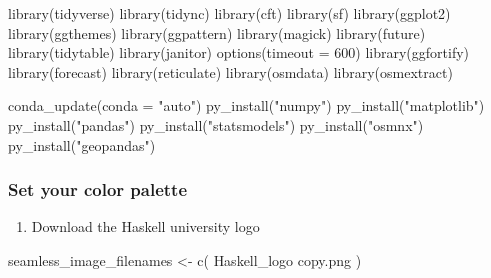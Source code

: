 \documentclass[
  paper=a4,
  ,captions=tableheading
]{scrartcl}
\newenvironment{Shaded}{\begin{snugshade}}{\end{snugshade}}
\newcommand{\AttributeTok}[1]{\textcolor[rgb]{0.77,0.63,0.00}{#1}}
\newcommand{\DecValTok}[1]{\textcolor[rgb]{0.00,0.00,0.81}{#1}}
\newcommand{\FunctionTok}[1]{\textcolor[rgb]{0.00,0.00,0.00}{#1}}
\newcommand{\NormalTok}[1]{#1}
\newcommand{\OtherTok}[1]{\textcolor[rgb]{0.56,0.35,0.01}{#1}}
\newcommand{\StringTok}[1]{\textcolor[rgb]{0.31,0.60,0.02}{#1}}
\providecommand{\tightlist}{%
  \setlength{\itemsep}{0pt}\setlength{\parskip}{0pt}}
\begin{document}
\begin{Shaded}
\begin{Highlighting}[]
\FunctionTok{library}\NormalTok{(tidyverse)}
\FunctionTok{library}\NormalTok{(tidync)}
\FunctionTok{library}\NormalTok{(cft)}
\FunctionTok{library}\NormalTok{(sf)}
\FunctionTok{library}\NormalTok{(ggplot2)}
\FunctionTok{library}\NormalTok{(ggthemes)}
\FunctionTok{library}\NormalTok{(ggpattern)}
\FunctionTok{library}\NormalTok{(magick)}
\FunctionTok{library}\NormalTok{(future)}
\FunctionTok{library}\NormalTok{(tidytable)}
\FunctionTok{library}\NormalTok{(janitor)}
\FunctionTok{options}\NormalTok{(}\AttributeTok{timeout =} \DecValTok{600}\NormalTok{)}
\FunctionTok{library}\NormalTok{(ggfortify)}
\FunctionTok{library}\NormalTok{(forecast)}
\FunctionTok{library}\NormalTok{(reticulate)}
\FunctionTok{library}\NormalTok{(osmdata)}
\FunctionTok{library}\NormalTok{(osmextract)}
\end{Highlighting}
\end{Shaded}

\begin{Shaded}
\begin{Highlighting}[]
\FunctionTok{conda\_update}\NormalTok{(}\AttributeTok{conda =} \StringTok{"auto"}\NormalTok{)}
\FunctionTok{py\_install}\NormalTok{(}\StringTok{"numpy"}\NormalTok{)}
\FunctionTok{py\_install}\NormalTok{(}\StringTok{"matplotlib"}\NormalTok{)}
\FunctionTok{py\_install}\NormalTok{(}\StringTok{"pandas"}\NormalTok{)}
\FunctionTok{py\_install}\NormalTok{(}\StringTok{"statsmodels"}\NormalTok{)}
\FunctionTok{py\_install}\NormalTok{(}\StringTok{"osmnx"}\NormalTok{)}
\FunctionTok{py\_install}\NormalTok{(}\StringTok{"geopandas"}\NormalTok{)}
\end{Highlighting}
\end{Shaded}

\hypertarget{set-your-color-palette}{%
\subsubsection{Set your color palette}\label{set-your-color-palette}}

\begin{enumerate}
\def\labelenumi{\arabic{enumi}.}
\tightlist
\item
  Download the Haskell university logo
\end{enumerate}

\begin{Shaded}
\begin{Highlighting}[]
\NormalTok{seamless\_image\_filenames }\OtherTok{\textless{}{-}} \FunctionTok{c}\NormalTok{(}
  \StringTok{\textquotesingle{}Haskell\_logo copy.png\textquotesingle{}}
\NormalTok{)}
\end{Highlighting}
\end{Shaded}
\end{document}
